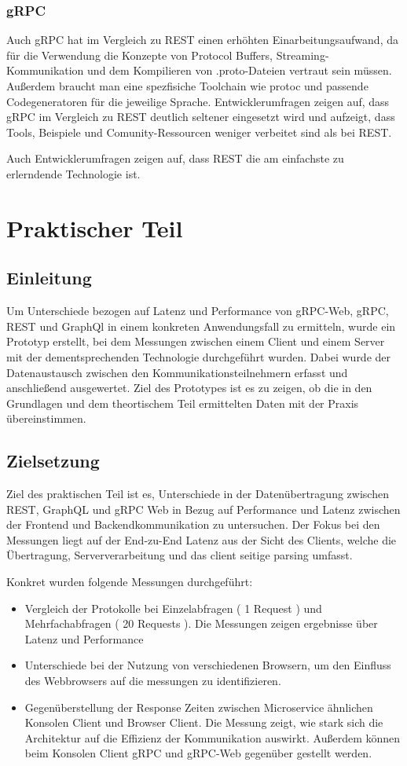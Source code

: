 \subsubsection{gRPC}
Auch gRPC hat im Vergleich zu REST einen erhöhten Einarbeitungsaufwand, da für die Verwendung die Konzepte von Protocol Buffers, Streaming-Kommunikation und dem Kompilieren von .proto-Dateien vertraut sein müssen. Außerdem braucht man eine spezfisiche Toolchain wie protoc und passende Codegeneratoren für die jeweilige Sprache. Entwicklerumfragen  zeigen auf, dass gRPC im Vergleich zu REST deutlich seltener eingesetzt wird und aufzeigt, dass Tools, Beispiele und Comunity-Ressourcen weniger verbeitet sind als bei REST.

Auch Entwicklerumfragen zeigen auf, dass REST die am einfachste zu erlerndende Technologie ist. 

\clearpage
\section{Praktischer Teil}
\subsection{Einleitung}
Um Unterschiede bezogen auf Latenz und Performance von gRPC-Web, gRPC, REST und GraphQl in einem konkreten Anwendungsfall zu ermitteln, wurde ein Prototyp erstellt, bei dem  Messungen zwischen einem Client und einem Server mit der dementsprechenden Technologie durchgeführt wurden. Dabei wurde der Datenaustausch zwischen den Kommunikationsteilnehmern erfasst und anschließend ausgewertet. Ziel des Prototypes ist es zu zeigen, ob die in den Grundlagen und dem theortischem Teil ermittelten Daten mit der Praxis übereinstimmen.

\subsection{Zielsetzung}
Ziel des praktischen Teil ist es, Unterschiede in der Datenübertragung zwischen REST, GraphQL und gRPC Web in Bezug auf Performance und Latenz zwischen der Frontend und Backendkommunikation zu untersuchen. Der Fokus bei den Messungen liegt auf der End-zu-End Latenz aus der Sicht des Clients, welche die Übertragung, Serververarbeitung und das client seitige parsing umfasst. 

Konkret wurden folgende Messungen durchgeführt: 
\begin{itemize}
	\item Vergleich der Protokolle bei Einzelabfragen ( 1 Request ) und Mehrfachabfragen ( 20 Requests ). Die Messungen zeigen ergebnisse über Latenz und Performance
	\item Unterschiede bei der Nutzung von verschiedenen Browsern, um den Einfluss des Webbrowsers auf die messungen zu identifizieren.
	\item Gegenüberstellung der Response Zeiten zwischen Microservice ähnlichen Konsolen Client und Browser Client. Die Messung zeigt, wie stark sich die Architektur auf die Effizienz der Kommunikation auswirkt. Außerdem können beim Konsolen Client gRPC und gRPC-Web gegenüber gestellt werden.
\end{itemize}

